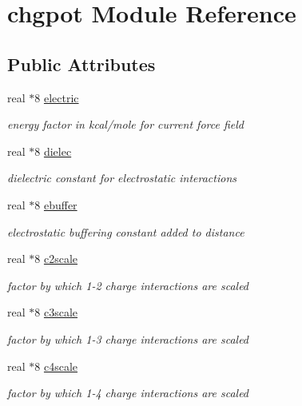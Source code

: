 \hypertarget{classchgpot}{\section{chgpot Module Reference}
\label{classchgpot}
}
\subsection*{Public Attributes}
\begin{DoxyCompactItemize}
\item 
real $\ast$8 \hyperlink{classchgpot_acc69d668f4908e5bdaad84b76861051f}{electric}
\begin{DoxyCompactList}\small\item\em energy factor in kcal/mole for current force field \end{DoxyCompactList}\item 
real $\ast$8 \hyperlink{classchgpot_a4e604b81e5aace26f2ca72d9b8f87010}{dielec}
\begin{DoxyCompactList}\small\item\em dielectric constant for electrostatic interactions \end{DoxyCompactList}\item 
real $\ast$8 \hyperlink{classchgpot_adc0e1ef630af9b001db33bd1e354bbfc}{ebuffer}
\begin{DoxyCompactList}\small\item\em electrostatic buffering constant added to distance \end{DoxyCompactList}\item 
real $\ast$8 \hyperlink{classchgpot_a6b7ceb761788269dabbaed681a4eab0c}{c2scale}
\begin{DoxyCompactList}\small\item\em factor by which 1-\/2 charge interactions are scaled \end{DoxyCompactList}\item 
real $\ast$8 \hyperlink{classchgpot_a105e63b84493a50e9b7de53bd826eeb7}{c3scale}
\begin{DoxyCompactList}\small\item\em factor by which 1-\/3 charge interactions are scaled \end{DoxyCompactList}\item 
real $\ast$8 \hyperlink{classchgpot_ae1c372d6354cffbc203abc5fe288e58e}{c4scale}
\begin{DoxyCompactList}\small\item\em factor by which 1-\/4 charge interactions are scaled \end{DoxyCompactList}\item 

\end{DoxyCompactItemize}
